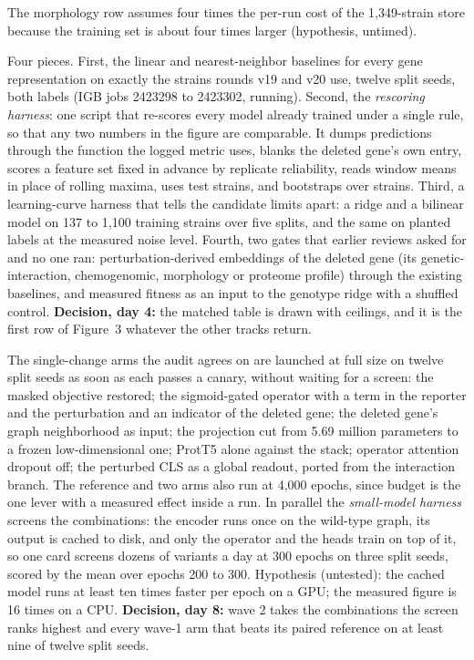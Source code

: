 The morphology row assumes four times the per-run cost of the 1{,}349-strain store because
the training set is about four times larger (hypothesis, untimed).

 Four
pieces. First, the linear and nearest-neighbor baselines for every gene representation on
exactly the strains rounds v19 and v20 use, twelve split seeds, both labels (IGB jobs
2423298 to 2423302, running). Second, the \emph{rescoring harness}: one script that
re-scores every model already trained under a single rule, so that any two numbers in the
figure are comparable. It dumps predictions through the function the logged metric uses,
blanks the deleted gene's own entry, scores a feature set fixed in advance by replicate
reliability, reads window means in place of rolling maxima, uses test strains, and
bootstraps over strains. Third, a learning-curve harness that tells the candidate limits
apart: a ridge and a bilinear model on 137 to 1{,}100 training strains over five splits,
and the same on planted labels at the measured noise level. Fourth, two gates that earlier
reviews asked for and no one ran: perturbation-derived embeddings of the deleted gene (its
genetic-interaction, chemogenomic, morphology or proteome profile) through the existing
baselines, and measured fitness as an input to the genotype ridge with a shuffled control.
\textbf{Decision, day 4:} the matched table is drawn with ceilings, and it is the first
row of Figure~3 whatever the other tracks return.

 The
single-change arms the audit agrees on are launched at full size on twelve split seeds as
soon as each passes a canary, without waiting for a screen: the masked objective restored;
the sigmoid-gated operator with a term in the reporter and the perturbation and an
indicator of the deleted gene; the deleted gene's graph neighborhood as input; the
projection cut from 5.69 million parameters to a frozen low-dimensional one; ProtT5 alone
against the stack; operator attention dropout off; the perturbed CLS as a global readout,
ported from the interaction branch. The reference and two arms also run at 4{,}000 epochs,
since budget is the one lever with a measured effect inside a run. In parallel the
\emph{small-model harness} screens the combinations: the encoder runs once on the
wild-type graph, its output is cached to disk, and only the operator and the heads train
on top of it, so one card screens dozens of variants a day at 300 epochs on three split
seeds, scored by the mean over epochs 200 to 300. Hypothesis (untested): the cached model
runs at least ten times faster per epoch on a GPU; the measured figure is 16 times on a
CPU. \textbf{Decision, day 8:} wave 2 takes the combinations the screen ranks highest and
every wave-1 arm that beats its paired reference on at least nine of twelve split seeds.

